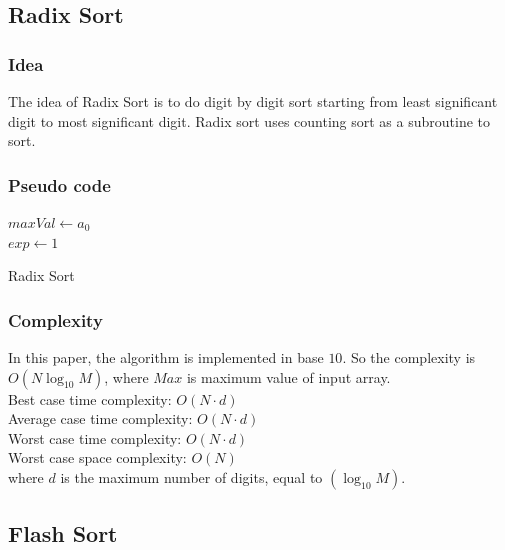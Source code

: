 \documentclass[11pt,a4paper]{article}
\begin{document}
\subsection{Radix Sort}
\subsubsection*{Idea}
The idea of Radix Sort is to do digit by digit sort starting from least significant digit to most significant digit. 
Radix sort uses counting sort as a subroutine to sort.

\subsubsection*{Pseudo code}
\begin{algorithm2e}
  \SetAlgoLined
  $maxVal \gets a_0$\\
  $exp \gets 1$\\
  
  \caption{Radix Sort}
\end{algorithm2e}

\subsubsection*{Complexity}
In this paper, the algorithm is implemented in base $10$. So the complexity is $O (N\log_{10} M)$, where $Max$ is maximum value of input array.\\
Best case time complexity: $O(N \cdot d)$ \\
Average case time complexity: $O(N \cdot d)$\\
Worst case time complexity: $O(N \cdot d)$ \\
Worst case space complexity: $O(N)$\\
where $d$ is the maximum number of digits, equal to $(\log_{10} M)$.

\subsection{Flash Sort}
\end{document}
